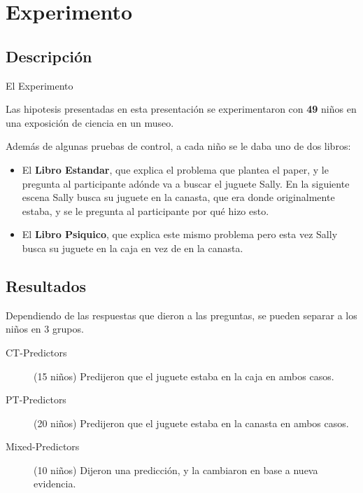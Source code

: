 \documentclass{beamer}
\begin{document}
\section{Experimento}
\subsection{Descripción}

\begin{frame}[fragile]{El Experimento}

Las hipotesis presentadas en esta presentación se experimentaron con \textbf{49} niños en una exposición de ciencia en un museo.

Además de algunas pruebas de control, a cada niño se le daba uno de dos libros:

\begin{itemize}
\item El \textbf{Libro Estandar}, que explica el problema que plantea el paper, y le pregunta al participante adónde va a buscar el juguete Sally. En la siguiente escena Sally busca su juguete en la canasta, que era donde originalmente estaba, y se le pregunta al participante por qué hizo esto.
\item El \textbf{Libro Psiquico}, que explica este mismo problema pero esta vez Sally busca su juguete en la caja en vez de en la canasta.
\end{itemize}

\end{frame}

\subsection{Resultados}

\begin{frame}
Dependiendo de las respuestas que dieron a las preguntas, se pueden separar a los niños en 3 grupos.

\begin{description}
	\item[CT-Predictors] (15 niños) Predijeron que el juguete estaba en la caja en ambos casos.
	\item[PT-Predictors] (20 niños) Predijeron que el juguete estaba en la canasta en ambos casos.
	\item[Mixed-Predictors] (10 niños) Dijeron una predicción, y la cambiaron en base a nueva evidencia.
\end{description}
\end{frame}
\end{document}
